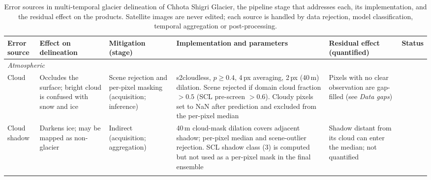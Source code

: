 \documentclass[10pt]{article}
\newcommand{\stfull}{\CIRCLE}
\newcommand{\stpart}{\LEFTcircle}
\newcommand{\grp}[1]{\multicolumn{6}{l}{\textit{#1}}\\}
\begin{document}
\begin{table}
\centering
\footnotesize
\setlength{\tabcolsep}{4pt}
\renewcommand{\arraystretch}{1.18}
\begin{threeparttable}
\caption{Error sources in multi-temporal glacier delineation of Chhota Shigri Glacier, the
pipeline stage that addresses each, its implementation, and the residual effect on the
products. Satellite images are never edited; each source is handled by data rejection,
model classification, temporal aggregation or post-processing.}
\label{tab:error_sources}
\begin{tabularx}{\textheight}{L{2.5cm} L{3.3cm} L{3.2cm} Y L{4.6cm} c}
\toprule
\textbf{Error source} & \textbf{Effect on delineation} & \textbf{Mitigation (stage)} &
\textbf{Implementation and parameters} & \textbf{Residual effect (quantified)} & \textbf{Status} \\
\midrule

\grp{Atmospheric}
Cloud &
Occludes the surface; bright cloud is confused with snow and ice &
Scene rejection and per-pixel masking (acquisition; inference) &
s2cloudless, $p \ge 0.4$, 4\,px averaging, 2\,px (40\,m) dilation. Scene rejected if domain cloud
fraction $> 0.5$ (SCL pre-screen $> 0.6$). Cloudy pixels set to NaN after prediction and excluded
from the per-pixel median &
Pixels with no clear observation are gap-filled (see \emph{Data gaps}) &
\stfull \\
Cloud shadow &
Darkens ice; may be mapped as non-glacier &
Indirect (acquisition; aggregation) &
40\,m cloud-mask dilation covers adjacent shadow; per-pixel median and scene-outlier rejection.
SCL shadow class (3) is computed but not used as a per-pixel mask in the final ensemble &
Shadow distant from its cloud can enter the median; not quantified &
\stpart \\
\addlinespace


\end{tabularx}
\end{threeparttable}
\end{table}
\end{document}
